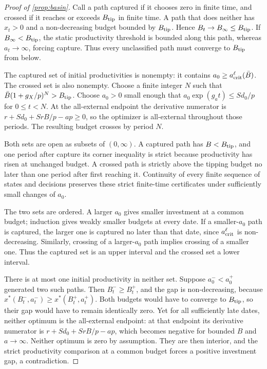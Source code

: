 \begin{proof}[Proof of \cref{prop:basin}]
Call a path captured if it chooses zero in finite time, and crossed if
it reaches or exceeds $B_{\rm tip}$ in finite time. A path that does
neither has $x_t>0$ and a non-decreasing budget bounded by
$B_{\rm tip}$. Hence $B_t\to B_\infty\leq B_{\rm tip}$.
If $B_\infty<B_{\rm tip}$, the static productivity threshold is
bounded along this path, whereas $a_t\to\infty$, forcing capture.
Thus every unclassified path must converge to $B_{\rm tip}$ from below.

The captured set of initial productivities is nonempty: it contains
$a_0\geq a_{\rm crit}^{\ell}(\bar B)$. The crossed set is also
nonempty. Choose a finite integer $N$ such that
$\bar B(1+g_X/p)^N>B_{\rm tip}$. Choose $a_0>0$ small enough that
$a_0\exp(g_at)\leq Sd_0/p$ for $0\leq t<N$. At the all-external
endpoint the derivative numerator is
$r+Sd_0+SrB/p-ap\geq0$, so the optimizer is all-external throughout
those periods. The resulting budget crosses by period $N$.

Both sets are open as subsets of $(0,\infty)$. A captured path has
$B<B_{\rm tip}$, and one period after capture its corner inequality
is strict because productivity has risen at unchanged budget. A
crossed path is strictly above the tipping budget no later than one
period after first reaching it. Continuity of every finite sequence of
states and decisions preserves these strict finite-time certificates
under sufficiently small changes of $a_0$.

The two sets are ordered. A larger $a_0$ gives smaller investment at a
common budget; induction gives weakly smaller budgets at every date.
If a smaller-$a_0$ path is captured, the larger one is captured no later
than that date, since $a_{\rm crit}^{\ell}$ is non-decreasing.
Similarly, crossing of a larger-$a_0$ path implies crossing of a smaller
one. Thus the captured set is an upper interval and the crossed set a
lower interval.

There is at most one initial productivity in neither set. Suppose
$a_0^-<a_0^+$ generated two such paths. Then $B_t^-\geq B_t^+$,
and the gap is non-decreasing, because
$x^*(B_t^-,a_t^-)\geq x^*(B_t^+,a_t^+)$. Both budgets would have to
converge to $B_{\rm tip}$, so their gap would have to remain identically
zero. Yet for all sufficiently late dates, neither optimum is the
all-external endpoint: at that endpoint its derivative numerator is
$r+Sd_0+SrB/p-ap$, which becomes negative for bounded $B$ and
$a\to\infty$. Neither optimum is zero by assumption. They are then
interior, and the strict productivity comparison at a common budget
forces a positive investment gap, a contradiction.


\end{proof}
